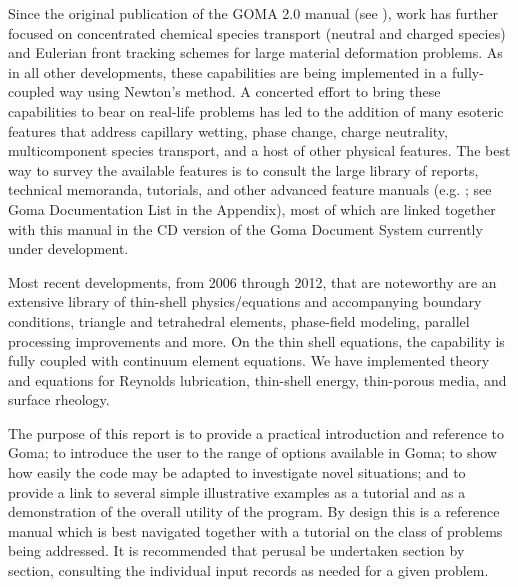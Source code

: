 Since the original publication of the GOMA 2.0 manual (see \citealt{Goma_2_manual}), work has further focused on concentrated chemical species transport (neutral and charged species) and Eulerian front tracking schemes for large material deformation problems. As in all other developments, these capabilities are being implemented in a fully-coupled way using Newton’s method. A concerted effort to bring these capabilities to bear on real-life problems has led to the addition of many esoteric features that address capillary wetting, phase change, charge neutrality, multicomponent species transport, and a host of other physical features. The best way to survey the available features is to consult the large library of reports, technical memoranda, tutorials, and other advanced feature manuals (e.g. \citealt{TALE_SAND, Goma_Advance_Capabilities_SAND, Goma_encapsulation_SAND}; see Goma Documentation List in the Appendix), most of which are linked together with this manual in the CD version of the Goma Document System currently under development.

Most recent developments, from 2006 through 2012, that are noteworthy are an extensive library of thin-shell physics/equations and accompanying boundary conditions, triangle and tetrahedral elements, phase-field modeling, parallel processing improvements and more. On the thin shell equations, the capability is fully coupled with continuum element equations. We have implemented theory and equations for Reynolds lubrication, thin-shell energy, thin-porous media, and surface rheology.

The purpose of this report is to provide a practical introduction and reference to Goma; to introduce the user to the range of options available in Goma; to show how easily the code may be adapted to investigate novel situations; and to provide a link to several simple illustrative examples as a tutorial and as a demonstration of the overall utility of the program. By design this is a reference manual which is best navigated together with a tutorial on the class of problems being addressed. It is recommended that perusal be undertaken section by section, consulting the individual input records as needed for a given problem.